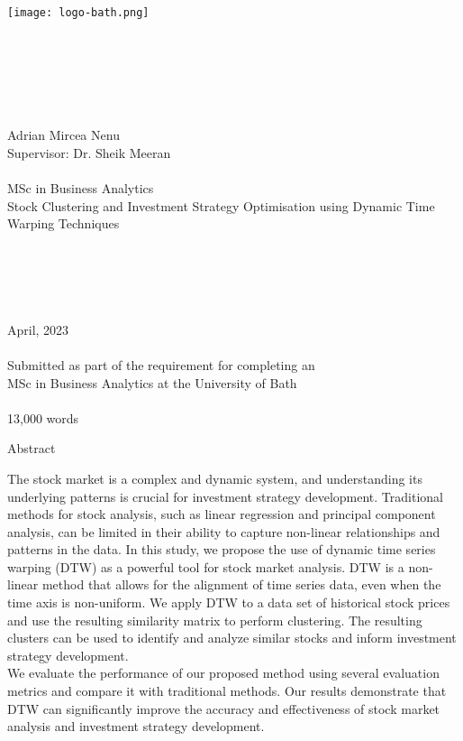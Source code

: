 \documentclass[12pt]{article}
\begin{document}
\begin{center}

    \texttt{[image: logo-bath.png]} 
    ~\\ 
    ~\\  
    ~\\  
    ~\\ 
    ~\\ 
    ~\\ 
    ~\\ 
    \small Adrian Mircea Nenu
    ~\\ 
    \small Supervisor: Dr. Sheik Meeran
    ~\\ 
    ~\\ 
    \large MSc in Business Analytics
    ~\\ 
    \Huge Stock Clustering and Investment Strategy Optimisation using Dynamic Time Warping Techniques 
    ~\\ 
    ~\\ 
    ~\\    
    ~\\    
    ~\\    
    ~\\    
    \Large April, 2023
    ~\\    
    ~\\    
    \large Submitted as part of the requirement for completing an \\
    MSc in Business Analytics at the University of Bath
    ~\\    
    ~\\    
    \small 13,000 words
\end{center}

\thispagestyle{empty}

\newpage


\begin{center} {\LARGE Abstract} \end{center}

The stock market is a complex and dynamic system, and understanding its underlying patterns is crucial for investment strategy development. Traditional methods for stock analysis, such as linear regression and principal component analysis, can be limited in their ability to capture non-linear relationships and patterns in the data. In this study, we propose the use of dynamic time series warping (DTW) as a powerful tool for stock market analysis. DTW is a non-linear method that allows for the alignment of time series data, even when the time axis is non-uniform. We apply DTW to a data set of historical stock prices and use the resulting similarity matrix to perform clustering. The resulting clusters can be used to identify and analyze similar stocks and inform investment strategy development. 
~\\
We evaluate the performance of our proposed method using several evaluation metrics and compare it with traditional methods. Our results demonstrate that DTW can significantly improve the accuracy and effectiveness of stock market analysis and investment strategy development.
\end{document}
